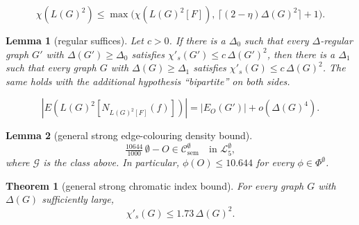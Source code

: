 \documentclass[10pt,a4paper]{amsart}
\newtheorem{theorem}{Theorem}
\newtheorem{lemma}{Lemma}
\newcommand{\Gcl}{\mathcal{G}}
\newcommand{\Lcl}{\mathcal{L}}
\newcommand{\SemCone}{\mathcal{C}_\mathrm{sem}}
\begin{document}
\begin{equation}
\label{eq:criticality-lift}
\chi(L(G)^2)
\leq \max\bigl(\chi(L(G)^2[F]),\,
\lceil(2 - \eta)\Delta(G)^2\rceil + 1\bigr).
\end{equation}

\begin{lemma}[regular suffices]
\label{lem:wlog-regular}
Let $c > 0$. If there is a $\Delta_0$ such that every
$\Delta$-regular graph $G'$ with $\Delta(G') \geq \Delta_0$ satisfies
$\chi'_s(G') \leq c\,\Delta(G')^2$, then there is a $\Delta_1$ such
that every graph $G$ with $\Delta(G) \geq \Delta_1$ satisfies
$\chi'_s(G) \leq c\,\Delta(G)^2$. The same holds with the additional
hypothesis ``bipartite'' on both sides.
\end{lemma}

\begin{equation}
\label{eq:EO-bridge}
|E(L(G)^2[N_{L(G)^2[F]}(f)])|
= |E_O(G')| + o(\Delta(G)^4).
\end{equation}

\begin{lemma}[general strong edge-colouring density bound]
\label{lem:sec-general-density}
\[
\tfrac{10644}{1000}\,\emptyset - O
\in \SemCone^\emptyset
\quad\text{in }\Lcl^\emptyset_5,
\]
where $\Gcl$ is the class above. In particular,
$\phi(O) \leq 10.644$ for every $\phi \in \Phi^\emptyset$.
\end{lemma}

\begin{theorem}[general strong chromatic index bound]
\label{thm:sec-general}
For every graph $G$ with $\Delta(G)$ sufficiently large,
\[
\chi'_s(G) \leq 1.73\,\Delta(G)^2.
\]
\end{theorem}
\end{document}
